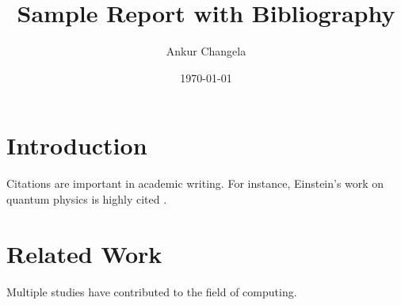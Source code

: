 \documentclass{article}
\title{Sample Report with Bibliography}
\author{Ankur Changela}
\date{\today}
\begin{document}
\maketitle

\section{Introduction}
Citations are important in academic writing. For instance, Einstein’s work on quantum physics is highly cited \cite{p1}.

\section{Related Work}
Multiple studies \cite{p2, p3} have contributed to the field of computing.

\end{document}
